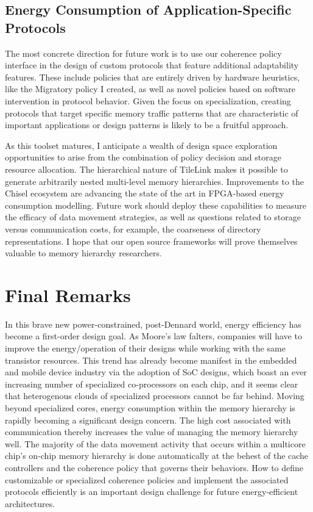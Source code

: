 \subsection{Energy Consumption of Application-Specific Protocols}

The most concrete direction for future work is to use our coherence policy interface
in the design of custom protocols that feature additional adaptability features.
These include policies that are entirely driven by hardware heuristics, like the Migratory policy
I created, as well as novel policies based on software intervention in protocol behavior.
Given the focus on specialization, creating protocols that target specific memory traffic patterns that are
characteristic of important applications or design patterns is likely to be a fruitful approach.

As this toolset matures, I anticipate a wealth of design space exploration opportunities to arise
from the combination of policy decision and storage resource allocation.
The hierarchical nature of TileLink makes it possible to generate arbitrarily nested multi-level memory hierarchies.
Improvements to the Chisel ecosystem are advancing the state of the art in FPGA-based energy consumption modelling.
Future work should deploy these capabilities to measure the efficacy of data movement strategies,
as well as questions related to storage versus communication costs, for example, the coarseness of directory representations.
I hope that our open source frameworks will prove themselves valuable to memory hierarchy researchers.

\section{Final Remarks}

In this brave new power-constrained, post-Dennard world, energy efficiency has become a first-order design goal.
As Moore's law falters, companies will have to improve the energy/operation of their designs
while working with the same transistor resources.
This trend has already become manifest in the embedded and mobile device industry via the adoption of SoC designs, which boast an ever increasing number of specialized co-processors on each chip, and it seems clear that heterogenous clouds of specialized processors cannot be far behind.
Moving beyond specialized cores, energy consumption within the memory hierarchy is rapidly becoming a significant design concern.
The high cost associated with communication thereby increases the value of managing the memory hierarchy well.
The majority of the data movement activity that occurs within a multicore chip's on-chip memory hierarchy is done automatically at the behest of the cache controllers and the coherence policy that governs their behaviors.
How to define customizable or specialized coherence policies and
implement the associated protocols efficiently is an important design challenge for future energy-efficient architectures. 


